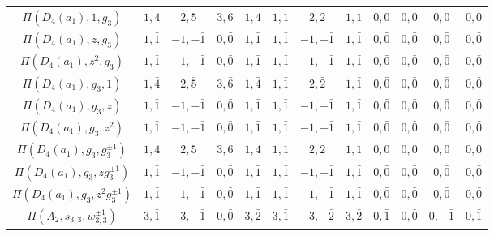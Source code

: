 \begin{table}[ht]
\begin{adjustbox}{max width=\linewidth}
\begin{tabular}{|c|ccccccccccc|}
        $\Pi(D_4(a_1),1,g_3)$   & $1, \bar{4}$ & $2, \bar{5}$ & $3, \bar{6}$ & $1, \bar{4}$ & $1, \bar{1}$ & $2, \bar{2}$ & $1, \bar{1}$ & $0, \bar{0}$ & $0, \bar{0}$ & $0, \bar{0}$ & $0, \bar{0}$ \\
        $\Pi(D_4(a_1),z,g_3)$   & $1, \bar{1}$ & $-1, -\bar{1}$ & $0, \bar{0}$ & $1, \bar{1}$ & $1, \bar{1}$ & $-1, -\bar{1}$ & $1, \bar{1}$ & $0, \bar{0}$ & $0, \bar{0}$ & $0, \bar{0}$ & $0, \bar{0}$ \\ 
        $\Pi(D_4(a_1),z^2,g_3)$ & $1, \bar{1}$ & $-1, -\bar{1}$ & $0, \bar{0}$ & $1, \bar{1}$ & $1, \bar{1}$ & $-1, -\bar{1}$ & $1, \bar{1}$ & $0, \bar{0}$ & $0, \bar{0}$ & $0, \bar{0}$ & $0, \bar{0}$ \\ 
        $\Pi(D_4(a_1),g_3,1)$   & $1, \bar{4}$ & $2, \bar{5}$ & $3, \bar{6}$ & $1, \bar{4}$ & $1, \bar{1}$ & $2, \bar{2}$ & $1, \bar{1}$ & $0, \bar{0}$ & $0, \bar{0}$ & $0, \bar{0}$ & $0, \bar{0}$ \\ 
        $\Pi(D_4(a_1),g_3,z)$   & $1, \bar{1}$ & $-1, -\bar{1}$ & $0, \bar{0}$ & $1, \bar{1}$ & $1, \bar{1}$ & $-1, -\bar{1}$ & $1, \bar{1}$ & $0, \bar{0}$ & $0, \bar{0}$ & $0, \bar{0}$ & $0, \bar{0}$ \\ 
        $\Pi(D_4(a_1),g_3,z^2)$ & $1, \bar{1}$ & $-1, -\bar{1}$ & $0, \bar{0}$ & $1, \bar{1}$ & $1, \bar{1}$ & $-1, -\bar{1}$ & $1, \bar{1}$ & $0, \bar{0}$ & $0, \bar{0}$ & $0, \bar{0}$ & $0, \bar{0}$ \\
        $\Pi(D_4(a_1),g_3,g_3^{\pm1})$ & $1, \bar{4}$ & $2, \bar{5}$ & $3, \bar{6}$ & $1, \bar{4}$ & $1, \bar{1}$ & $2, \bar{2}$ & $1, \bar{1}$ & $0, \bar{0}$ & $0, \bar{0}$ & $0, \bar{0}$ & $0, \bar{0}$ \\ 
        $\Pi(D_4(a_1),g_3,zg_3^{\pm1})$ & $1, \bar{1}$ & $-1, -\bar{1}$ & $0, \bar{0}$ & $1, \bar{1}$ & $1, \bar{1}$ & $-1, -\bar{1}$ & $1, \bar{1}$ & $0, \bar{0}$ & $0, \bar{0}$ & $0, \bar{0}$ & $0, \bar{0}$ \\ 
        $\Pi(D_4(a_1),g_3,z^2g_3^{\pm1})$ & $1, \bar{1}$ & $-1, -\bar{1}$ & $0, \bar{0}$ & $1, \bar{1}$ & $1, \bar{1}$ & $-1, -\bar{1}$ & $1, \bar{1}$ & $0, \bar{0}$ & $0, \bar{0}$ & $0, \bar{0}$ & $0, \bar{0}$ \\  \hline 

        $\Pi(A_2,s_{3,3},w_{3,3}^{\pm1})$ & $3, \bar{1}$ & $-3, -\bar{1}$ & $0, \bar{0}$ & $3, \bar{2}$ & $3, \bar{1}$ & $-3, -\bar{2}$ & $3, \bar{2}$ & $0, \bar{1}$ & $0, \bar{0}$ & $0, -\bar{1}$ & $0, \bar{1}$ \\ \hline
        \end{tabular}
        \end{adjustbox}
    \end{table}
    
